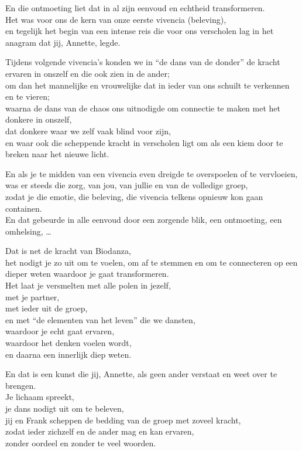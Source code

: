 \documentclass[
  11pt,
]{book}
\begin{document}
En die ontmoeting liet dat in al zijn eenvoud en echtheid transformeren.\\
Het was voor ons de kern van onze eerste vivencia (beleving),\\
en tegelijk het begin van een intense reis die voor ons verscholen lag in het anagram dat jij, Annette, legde.

Tijdens volgende vivencia's konden we in ``de dans van de donder'' de kracht ervaren in onszelf en die ook zien in de ander;\\
om dan het mannelijke en vrouwelijke dat in ieder van ons schuilt te verkennen en te vieren;\\
waarna de dans van de chaos ons uitnodigde om connectie te maken met het donkere in onszelf,\\
dat donkere waar we zelf vaak blind voor zijn,\\
en waar ook die scheppende kracht in verscholen ligt om als een kiem door te breken naar het nieuwe licht.

En als je te midden van een vivencia even dreigde te overspoelen of te vervloeien,\\
was er steeds die zorg, van jou, van jullie en van de volledige groep,\\
zodat je die emotie, die beleving, die vivencia telkens opnieuw kon gaan containen.\\
En dat gebeurde in alle eenvoud door een zorgende blik, een ontmoeting, een omhelsing, \ldots{}

Dat is net de kracht van Biodanza,\\
het nodigt je zo uit om te voelen, om af te stemmen en om te connecteren op een dieper weten waardoor je gaat transformeren.\\
Het laat je versmelten met alle polen in jezelf,\\
met je partner,\\
met ieder uit de groep,\\
en met ``de elementen van het leven'' die we dansten,\\
waardoor je echt gaat ervaren,\\
waardoor het denken voelen wordt,\\
en daarna een innerlijk diep weten.

En dat is een kunst die jij, Annette, als geen ander verstaat en weet over te brengen.\\
Je lichaam spreekt,\\
je dans nodigt uit om te beleven,\\
jij en Frank scheppen de bedding van de groep met zoveel kracht,\\
zodat ieder zichzelf en de ander mag en kan ervaren,\\
zonder oordeel en zonder te veel woorden.
\end{document}
